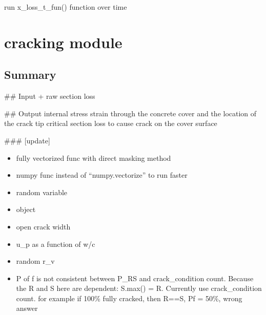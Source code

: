 \documentclass[letterpaper,10pt,english]{sphinxmanual}
\begin{document}

\begin{fulllineitems}
\label{\detokenize{corrosion:corrosion.x_loss_year}}
\sphinxAtStartPar
run x\_loss\_t\_fun() function over time

\end{fulllineitems}



\section{cracking module}
\label{\detokenize{cracking:module-cracking}}\label{\detokenize{cracking:cracking-module}}\label{\detokenize{cracking::doc}}

\subsection{Summary}
\label{\detokenize{cracking:summary}}
\sphinxAtStartPar
\#\# Input
+ raw
section loss

\sphinxAtStartPar
\#\# Output
internal stress strain through the concrete cover and the location of the crack tip
critical section loss to cause crack on the cover surface

\sphinxAtStartPar
\#\#\# {[}update{]}
\begin{itemize}
\item {} 
\sphinxAtStartPar
fully vectorized func with direct masking method

\item {} 
\sphinxAtStartPar
numpy func instead of “numpy.vectorize” to run faster

\item {} 
\sphinxAtStartPar
random variable

\item {} 
\sphinxAtStartPar
object

\item {} 
\sphinxAtStartPar
open crack width

\item {} 
\sphinxAtStartPar
u\_p as a function of w/c

\item {} 
\sphinxAtStartPar
random r\_v

\item {} 
\sphinxAtStartPar
P of f is not consistent between P\_RS and crack\_condition count. Because the R and S here are dependent: S.max() = R. Currently use crack\_condition count. for example if 100\% fully cracked, then R==S, Pf = 50\%, wrong answer

\end{itemize}
\end{document}
